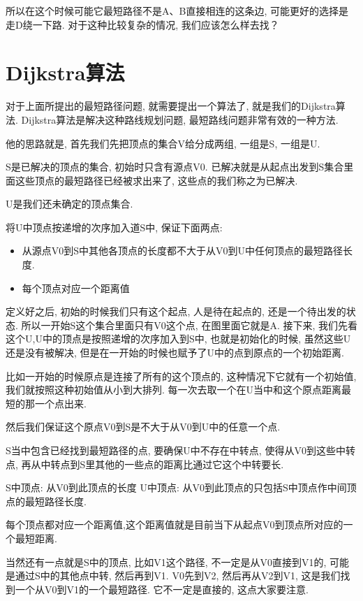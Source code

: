 所以在这个时候可能它最短路径不是A、B直接相连的这条边, 可能更好的选择是走D绕一下路. 对于这种比较复杂的情况, 我们应该怎么样去找？

\section{Dijkstra算法}

对于上面所提出的最短路径问题, 就需要提出一个算法了, 就是我们的Dijkstra算法. Dijkstra算法是解决这种路线规划问题, 最短路线问题非常有效的一种方法. 

他的思路就是, 首先我们先把顶点的集合V给分成两组, 一组是S, 一组是U. 

S是已解决的顶点的集合, 初始时只含有源点V0. 已解决就是从起点出发到S集合里面这些顶点的最短路径已经被求出来了, 这些点的我们称之为已解决. 

U是我们还未确定的顶点集合. 

将U中顶点按递增的次序加入道S中, 保证下面两点: 

\begin{itemize}
  \item 从源点V0到S中其他各顶点的长度都不大于从V0到U中任何顶点的最短路径长度. 
  \item 每个顶点对应一个距离值
\end{itemize}

定义好之后, 初始的时候我们只有这个起点, 人是待在起点的, 还是一个待出发的状态. 所以一开始S这个集合里面只有V0这个点, 在图里面它就是A. 接下来, 我们先看这个U,U中的顶点是按照递增的次序加入到S中, 也就是初始化的时候, 虽然这些U还是没有被解决, 但是在一开始的时候也赋予了U中的点到原点的一个初始距离. 

比如一开始的时候原点是连接了所有的这个顶点的, 这种情况下它就有一个初始值, 我们就按照这种初始值从小到大排列. 每一次去取一个在U当中和这个原点距离最短的那一个点出来. 

然后我们保证这个原点V0到S是不大于从V0到U中的任意一个点. 

S当中包含已经找到最短路径的点, 要确保U中不存在中转点, 使得从V0到这些中转点, 再从中转点到S里其他的一些点的距离比通过它这个中转要长. 

S中顶点: 从V0到此顶点的长度
U中顶点: 从V0到此顶点的只包括S中顶点作中间顶点的最短路径长度. 

每个顶点都对应一个距离值,这个距离值就是目前当下从起点V0到顶点所对应的一个最短距离. 

当然还有一点就是S中的顶点, 比如V1这个路径, 不一定是从V0直接到V1的, 可能是通过S中的其他点中转, 然后再到V1. V0先到V2, 然后再从V2到V1, 这是我们找到一个从V0到V1的一个最短路径. 它不一定是直接的, 这点大家要注意. 

